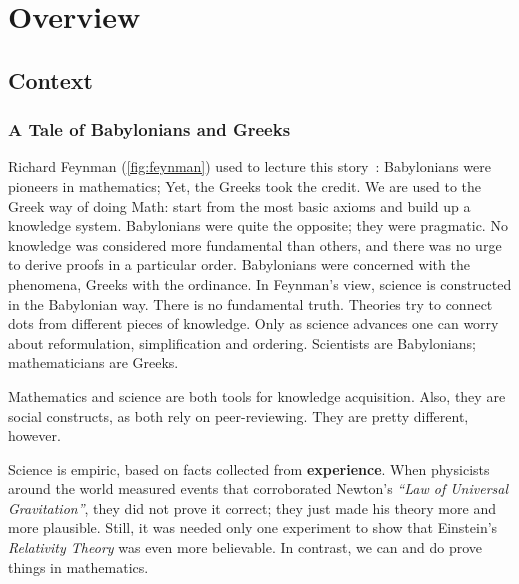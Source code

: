 \chapter{Overview}\label{ch:introduction}


\section{Context}

\subsection{A Tale of Babylonians and Greeks}




\protect{}
Richard Feynman (\cref{fig:feynman}) used to lecture this story~\cite{feynman:1994}: Babylonians were pioneers in mathematics; Yet, the Greeks took the credit. We are used to the Greek way of doing Math: start from the most basic axioms and build up a knowledge system. Babylonians were quite the opposite; they were pragmatic. No knowledge was considered more fundamental than others, and there was no urge to derive proofs in a particular order. Babylonians were concerned with the phenomena, Greeks with the ordinance. In Feynman's view, science is constructed in the Babylonian way. There is no fundamental truth. Theories try to connect dots from different pieces of knowledge. Only as science advances one can worry about reformulation, simplification and ordering. Scientists are Babylonians; mathematicians are Greeks.

Mathematics and science are both tools for knowledge acquisition. Also, they are social constructs, as both rely on peer-reviewing. They are pretty different, however.

Science is empiric, based on facts collected from \textbf{experience}. When physicists around the world measured events that corroborated Newton's \emph{``Law of Universal Gravitation''}, they did not prove it correct; they just made his theory more and more plausible. Still, it was needed only one experiment to show that Einstein's \emph{Relativity Theory} was even more believable. In contrast, we can and do prove things in mathematics.

